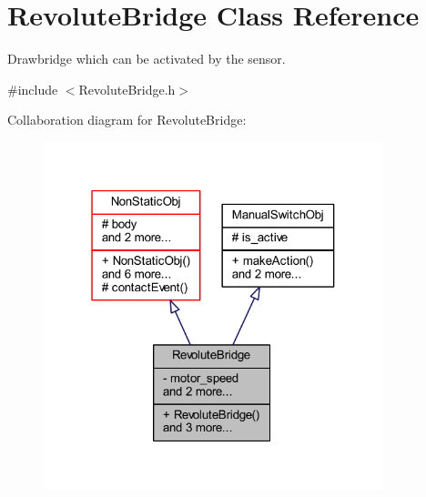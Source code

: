 \hypertarget{class_revolute_bridge}{}\section{Revolute\+Bridge Class Reference}
\label{class_revolute_bridge}


Drawbridge which can be activated by the sensor.  




{\ttfamily \#include $<$Revolute\+Bridge.\+h$>$}



Collaboration diagram for Revolute\+Bridge\+:
\nopagebreak
\begin{figure}[H]
\begin{center}
\leavevmode
\includegraphics[width=280pt]{class_revolute_bridge__coll__graph}
\end{center}
\end{figure}

